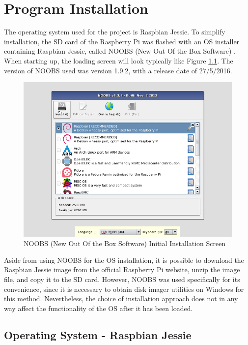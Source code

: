 \chapter{Program Installation}

The operating system used for the project is Raspbian Jessie. To simplify installation, the SD card of the Raspberry Pi was flashed with an OS installer containing Raspbian Jessie, called NOOBS (New Out Of the Box Software) \cite{rpi3noobs}. When starting up, the loading screen will look typically like Figure \ref{rpi3noobs}. The version of NOOBS used was version 1.9.2, with a release date of 27/5/2016. 

\begin{figure}[H]
	\centering
	\includegraphics[width=\linewidth]{noobs.png}
	\caption{NOOBS (New Out Of the Box Software) Initial Installation Screen \cite{rpi3noobs}}
	\label{rpi3noobs}
\end{figure}

Aside from using NOOBS for the OS installation, it is possible to download the Raspbian Jessie image from the official Raspberry Pi website, unzip the image file, and copy it to the SD card. However, NOOBS was used specifically for its convenience, since it is necessary to obtain disk imager utilities on Windows for this method. Nevertheless, the choice of installation approach does not in any way affect the functionality of the OS after it has been loaded.  

\section{Operating System - Raspbian Jessie}
\label{appraspbianjessie}







